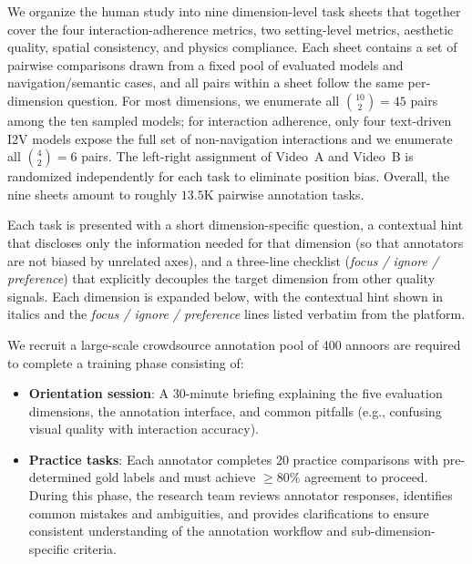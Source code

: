 We organize the human study into nine dimension-level task sheets that together cover the four interaction-adherence metrics, two setting-level metrics, aesthetic quality, spatial consistency, and physics compliance. Each sheet contains a set of pairwise comparisons drawn from a fixed pool of evaluated models and navigation/semantic cases, and all pairs within a sheet follow the same per-dimension question. For most dimensions, we enumerate all $\binom{10}{2}=45$ pairs among the ten sampled models; for interaction adherence, only four text-driven I2V models expose the full set of non-navigation interactions and we enumerate all $\binom{4}{2}=6$ pairs. The left-right assignment of Video~A and Video~B is randomized independently for each task to eliminate position bias. Overall, the nine sheets amount to roughly $13.5$K pairwise annotation tasks.


Each task is presented with a short dimension-specific question, a contextual hint that discloses only the information needed for that dimension (so that annotators are not biased by unrelated axes), and a three-line checklist (\emph{focus / ignore / preference}) that explicitly decouples the target dimension from other quality signals. Each dimension is expanded below, with the contextual hint shown in italics and the \emph{focus / ignore / preference} lines listed verbatim from the platform.


We recruit a large-scale crowdsource annotation pool of 400 annoors are required to complete a training phase consisting of:
\begin{itemize}[nosep,leftmargin=*]
  \item \textbf{Orientation session}: A 30-minute briefing explaining the five evaluation dimensions, the annotation interface, and common pitfalls (e.g., confusing visual quality with interaction accuracy).
  \item \textbf{Practice tasks}: Each annotator completes 20 practice comparisons with pre-determined gold labels and must achieve $\geq 80\%$ agreement to proceed. During this phase, the research team reviews annotator responses, identifies common mistakes and ambiguities, and provides clarifications to ensure consistent understanding of the annotation workflow and sub-dimension-specific criteria.


\end{itemize}

